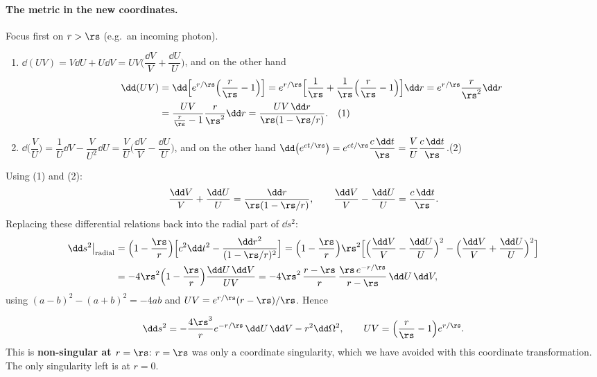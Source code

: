 \paragraph{The metric in the new coordinates.} Focus first on $r>\rs$ (e.g.\ an incoming photon).
\begin{enumerate}[label=(\roman*)]
\item $\dd(UV)=V\dd U+U\dd V=UV\Big(\dfrac{\dd V}V+\dfrac{\dd U}U\Big)$, and on the other hand
\begin{align*}
  \dd(UV)&=\dd\Big[e^{r/\rs}\Big(\frac r\rs-1\Big)\Big]=e^{r/\rs}\Big[\frac1\rs+\frac1\rs\Big(\frac r\rs-1\Big)\Big]\dd r=e^{r/\rs}\frac{r}{\rs^2}\dd r\\
  &=\frac{UV}{\frac r\rs-1}\frac{r}{\rs^2}\dd r=\frac{UV\,\dd r}{\rs(1-\rs/r)}.\quad(1)
\end{align*}
\item $\dd\Big(\dfrac VU\Big)=\dfrac1U\dd V-\dfrac V{U^2}\dd U=\dfrac VU\Big(\dfrac{\dd V}V-\dfrac{\dd U}U\Big)$, and on the other hand $\dd\big(e^{ct/\rs}\big)=e^{ct/\rs}\dfrac{c\,\dd t}{\rs}=\dfrac VU\dfrac{c\,\dd t}{\rs}$.\quad(2)
\end{enumerate}
Using (1) and (2):
\begin{equation}
  \frac{\dd V}V+\frac{\dd U}U=\frac{\dd r}{\rs(1-\rs/r)},\qquad\frac{\dd V}V-\frac{\dd U}U=\frac{c\,\dd t}{\rs}.
\end{equation}
Replacing these differential relations back into the radial part of $\dd s^2$:
\begin{align}
  \dd s^2\big|_{\rm radial}&=\Big(1-\frac\rs r\Big)\Big[c^2\dd t^2-\frac{\dd r^2}{(1-\rs/r)^2}\Big]
  =\Big(1-\frac\rs r\Big)\rs^2\Big[\Big(\frac{\dd V}V-\frac{\dd U}U\Big)^2-\Big(\frac{\dd V}V+\frac{\dd U}U\Big)^2\Big]\nonumber\\
  &=-4\rs^2\Big(1-\frac\rs r\Big)\frac{\dd U\,\dd V}{UV}
  =-4\rs^2\,\frac{r-\rs}{r}\,\frac{\rs\,e^{-r/\rs}}{r-\rs}\,\dd U\,\dd V ,
\end{align}
using $(a-b)^2-(a+b)^2=-4ab$ and $UV=e^{r/\rs}(r-\rs)/\rs$. Hence
\begin{keyresult}
\begin{equation}
  \dd s^2=-\frac{4\rs^3}{r}e^{-r/\rs}\,\dd U\,\dd V-r^2\dd\Omega^2,\qquad UV=\Big(\frac r\rs-1\Big)e^{r/\rs}.
\end{equation}
This is \textbf{non-singular at $r=\rs$}: $r=\rs$ was only a coordinate singularity, which we have avoided with this coordinate transformation. The only singularity left is at $r=0$.
\end{keyresult}

